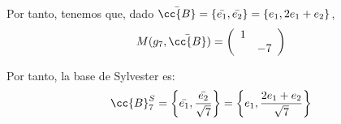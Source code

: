 \begin{ejercicio}
\begin{enumerate}
        Por tanto, tenemos que, dado $\bar{\cc{B}} = \{\bar{e_1},\bar{e_2}\} = \{e_1, 2e_1+e_2\}$,
        \begin{equation*}
            M(g_7, \bar{\cc{B}}) = \left(\begin{array}{cc}
            1 &  \\
             & -7
        \end{array} \right)
        \end{equation*}

        Por tanto, la base de Sylvester es:
        \begin{equation*}
            \cc{B}_7^S = \left\{\bar{e_1},\frac{\bar{e_2}}{\sqrt{7}}\right\} = \left\{e_1, \frac{2e_1+e_2}{\sqrt{7}}\right\}
        \end{equation*}
    \end{enumerate}
\end{ejercicio}

